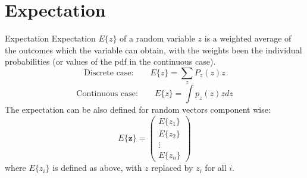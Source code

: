\documentclass{beamer}
\begin{document}
%
%
%
%
%
%
%

\section{Expectation}

\begin{frame}{Expectation}
  Expectation $E\{z\}$ of a random variable $z$ is a weighted average of the
  outcomes which the variable can obtain, with the weights been the individual
  probabilities (or values of the pdf in the continuous case).
  \[
  \text{Discrete case:} \qquad
  E\{z\} = \sum_{z} P_{z}(z)z
  \]
  \[
  \text{Continuous case:} \qquad
  E\{z\} = \int p_{z}(z)zdz
  \]
  The expectation can be also defined for random vectors component wise:
  \[
  E\{\mathbf{z}\} =
  \begin{pmatrix} E\{z_1\} \\ E\{z_2\} \\ \vdots \\ E\{z_n\} \end{pmatrix}
  \]
  where $E\{z_i\}$ is defined as above, with $z$ replaced by $z_i$ for all $i$.
\end{frame}
\end{document}
